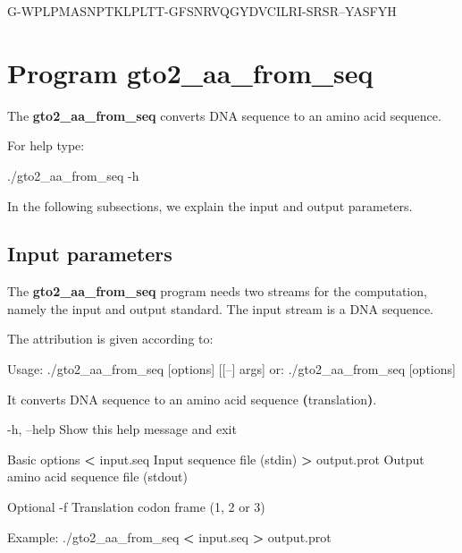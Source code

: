 \documentclass[11pt,]{krantz}
\newenvironment{Shaded}{\begin{snugshade}}{\end{snugshade}}
\newcommand{\KeywordTok}[1]{\textcolor[rgb]{0.27,0.27,0.27}{\textbf{#1}}}
\newcommand{\OperatorTok}[1]{\textcolor[rgb]{0.43,0.43,0.43}{\textbf{#1}}}
\newcommand{\ExtensionTok}[1]{#1}
\newcommand{\NormalTok}[1]{#1}
\begin{document}
\begin{Shaded}
\begin{Highlighting}[]
\ExtensionTok{G-WPLPMASNPTKLPLTT-GFSNRVQGYDVCILRI-SRSR--YASFYH}
\end{Highlighting}
\end{Shaded}

\section{Program gto2\_aa\_from\_seq}\label{program-gto2_aa_from_seq}

The \textbf{gto2\_aa\_from\_seq} converts DNA sequence to an amino acid
sequence.

For help type:

\begin{Shaded}
\begin{Highlighting}[]
\ExtensionTok{./gto2_aa_from_seq}\NormalTok{ -h}
\end{Highlighting}
\end{Shaded}

In the following subsections, we explain the input and output
parameters.

\subsection*{Input parameters}\label{input-parameters-31}


The \textbf{gto2\_aa\_from\_seq} program needs two streams for the
computation, namely the input and output standard. The input stream is a
DNA sequence.

The attribution is given according to:

\begin{Shaded}
\begin{Highlighting}[]
\ExtensionTok{Usage}\NormalTok{: ./gto2_aa_from_seq [options] [[--] args]}
   \ExtensionTok{or}\NormalTok{: ./gto2_aa_from_seq [options]}

\ExtensionTok{It}\NormalTok{ converts DNA sequence to an amino acid sequence }
\KeywordTok{(}\ExtensionTok{translation}\KeywordTok{)}\ExtensionTok{.}

    \ExtensionTok{-h}\NormalTok{, --help      Show this help message and exit}

\ExtensionTok{Basic}\NormalTok{ options}
    \OperatorTok{<} \ExtensionTok{input.seq}\NormalTok{     Input sequence file (stdin)}
    \OperatorTok{>} \ExtensionTok{output.prot}\NormalTok{   Output amino acid sequence file (stdout)}

\ExtensionTok{Optional}
    \ExtensionTok{-f}\NormalTok{              Translation codon frame (1, 2 or 3)}

\ExtensionTok{Example}\NormalTok{: ./gto2_aa_from_seq }\OperatorTok{<}\NormalTok{ input.seq }\OperatorTok{>}\NormalTok{ output.prot}
\end{Highlighting}
\end{Shaded}
\end{document}
